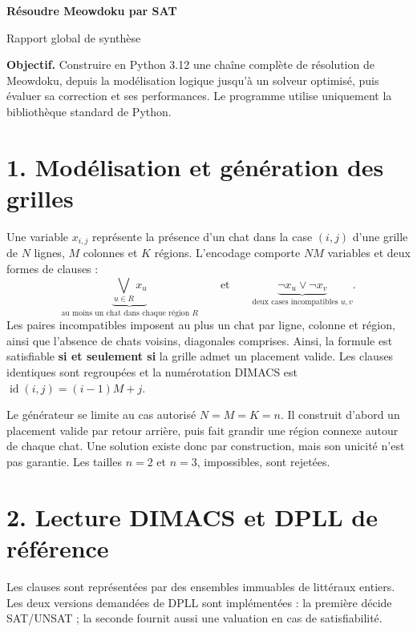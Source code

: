 \documentclass[11pt,a4paper]{article}
\begin{document}
\begin{center}
  {\LARGE\bfseries Résoudre Meowdoku par SAT}\par\vspace{5pt}
  {\large Rapport global de synthèse}
\end{center}

\textbf{Objectif.} Construire en Python 3.12 une chaîne complète de
résolution de Meowdoku, depuis la modélisation logique jusqu'à un solveur
optimisé, puis évaluer sa correction et ses performances. Le programme
utilise uniquement la bibliothèque standard de Python.

\begin{center}
\end{center}

\section*{1. Modélisation et génération des grilles}

Une variable $x_{i,j}$ représente la présence d'un chat dans la case
$(i,j)$ d'une grille de $N$ lignes, $M$ colonnes et $K$ régions.
L'encodage comporte $NM$ variables et deux formes de clauses :
\[
  \underbrace{\bigvee_{u\in R} x_u}_{\text{au moins un chat dans chaque région }R}
  \qquad\text{et}\qquad
  \underbrace{\neg x_u\lor\neg x_v}_{\text{deux cases incompatibles }u,v}.
\]
Les paires incompatibles imposent au plus un chat par ligne, colonne et
région, ainsi que l'absence de chats voisins, diagonales comprises.
Ainsi, la formule est satisfiable \textbf{si et seulement si} la grille
admet un placement valide. Les clauses identiques sont regroupées et la
numérotation DIMACS est $\operatorname{id}(i,j)=(i-1)M+j$.

Le générateur se limite au cas autorisé $N=M=K=n$. Il construit d'abord
un placement valide par retour arrière, puis fait grandir une région
connexe autour de chaque chat. Une solution existe donc par construction,
mais son unicité n'est pas garantie. Les tailles $n=2$ et $n=3$, impossibles,
sont rejetées.

\section*{2. Lecture DIMACS et DPLL de référence}

Les clauses sont représentées par des ensembles immuables de littéraux
entiers. Les deux versions demandées de DPLL sont implémentées : la
première décide SAT/UNSAT ; la seconde fournit aussi une valuation en cas
de satisfiabilité.
\end{document}

